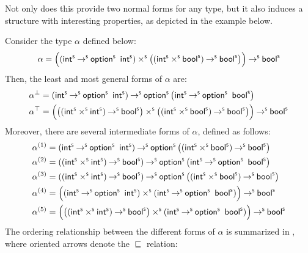 Not only does this provide two normal forms for any type, but it also induces a structure with interesting properties, as depicted in the example below.

\begin{example}
  \label{ex:lgf-mgf}
  Consider the type $\alpha$ defined below:
  \[
  \alpha = \Big((\intS \toS \optS\ \intS) \timesS \big((\intS \timesS \boolS) \toS \boolS\big)\Big) \toS \boolS
  \]
  Then, the least and most general forms of $\alpha$ are:
  \begin{align*}
    \lgf{\alpha} &= (\intS \toS \optS\ \intS) \toS \optS\big(\intS \toS \optS\ \boolS\big)\\
    \mgf{\alpha} &= \Big(\big((\intS \timesS \intS) \toS \boolS\big) \timesS \big((\intS \timesS \boolS) \toS \boolS\big)\Big) \toS \boolS
  \end{align*}
  Moreover, there are several intermediate forms of $\alpha$, defined as follows:
  \begin{align*}
    \alpha^{(1)} &= (\intS \toS \optS\ \intS) \toS \optS\big((\intS \timesS \boolS) \toS \boolS\big)\\
    \alpha^{(2)} &= ((\intS \timesS \intS) \toS \boolS) \toS \optS\big(\intS \toS \optS\ \boolS\big)\\
    \alpha^{(3)} &= ((\intS \timesS \intS) \toS \boolS) \toS \optS\big((\intS \timesS \boolS) \toS \boolS\big)\\
    \alpha^{(4)} &= \Big((\intS \toS \optS\ \intS) \timesS (\intS \toS \optS\ \boolS)\Big) \toS \boolS\\
    \alpha^{(5)} &= \Big(\big((\intS \timesS \intS) \toS \boolS\big) \timesS (\intS \toS \optS\ \boolS)\Big) \toS \boolS
  \end{align*}
  The ordering relationship between the different forms of $\alpha$ is summarized in , where oriented arrows denote the $\sqsubseteq$ relation:
  \begin{center}
\end{center}
\end{example}
